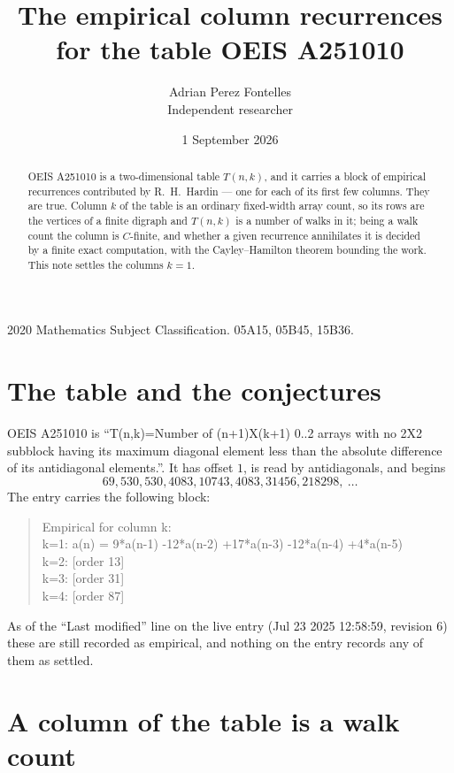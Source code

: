 \documentclass[11pt,a4paper]{article}
\title{The empirical column recurrences for the table OEIS A251010}
\author{Adrian Perez Fontelles\\ \small Independent researcher}
\date{1 September 2026}
\theoremstyle{plain}
\theoremstyle{definition}
\begin{document}
\maketitle

\begin{abstract}
OEIS A251010 is a two-dimensional table $T(n,k)$, and it carries a block of empirical
recurrences contributed by R.~H.~Hardin --- one for each of its first few columns. They are
true. Column $k$ of the table is an ordinary fixed-width array count, so its rows are the
vertices of a finite digraph and $T(n,k)$ is a number of walks in it; being a walk count the
column is $C$-finite, and whether a given recurrence annihilates it is decided by a finite
exact computation, with the Cayley--Hamilton theorem bounding the work. This note settles the columns $k=1$.
\end{abstract}

\noindent\small 2020 Mathematics Subject Classification. 05A15, 05B45, 15B36.\normalsize

\section{The table and the conjectures}

OEIS A251010 is ``T(n,k)=Number of (n+1)X(k+1) 0..2 arrays with no 2X2 subblock having its maximum diagonal element less than the absolute difference of its antidiagonal elements.''. It has offset $1$, is
read by antidiagonals, and begins
\[
69, 530, 530, 4083, 10743, 4083, 31456, 218298,\ \dots
\]
The entry carries the following block:
\begin{quote}\small
Empirical for column k:\\
k=1: a(n) = 9*a(n-1) -12*a(n-2) +17*a(n-3) -12*a(n-4) +4*a(n-5)\\
k=2: [order 13]\\
k=3: [order 31]\\
k=4: [order 87]\\
\end{quote}
As of the ``Last modified'' line on the live entry (Jul 23 2025 12:58:59, revision 6) these are still
recorded as empirical, and nothing on the entry records any of them as settled.

\section{A column of the table is a walk count}
\end{document}
